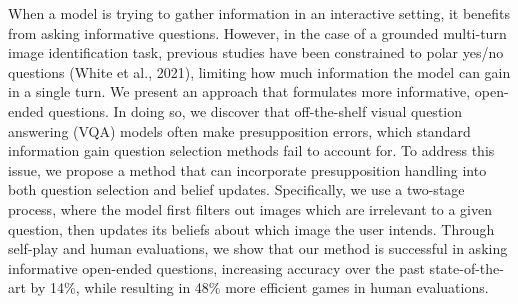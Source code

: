 When a model is trying to gather information in an interactive setting, it benefits from asking informative questions. However, in the case of a grounded multi-turn image identification task, previous studies have been constrained to polar yes/no questions (White et al., 2021), limiting how much information the model can gain in a single turn. We present an approach that formulates more informative, open-ended questions. In doing so, we discover that off-the-shelf visual question answering (VQA) models often make presupposition errors, which standard information gain question selection methods fail to account for. To address this issue, we propose a method that can incorporate presupposition handling into both question selection and belief updates. Specifically, we use a two-stage process, where the model first filters out images which are irrelevant to a given question, then updates its beliefs about which image the user intends. Through self-play and human evaluations, we show that our method is successful in asking informative open-ended questions, increasing accuracy over the past state-of-the-art by 14\%, while resulting in 48\% more efficient games in human evaluations.